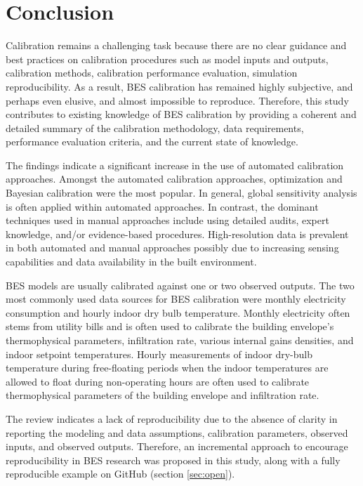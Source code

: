 \documentclass[review]{elsarticle}
\begin{document}
\section{Conclusion} \label{sec:conclusion}

Calibration remains a challenging task because there are no clear guidance and best practices on calibration procedures such as model inputs and outputs, calibration methods, calibration performance evaluation, simulation reproducibility. As a result, BES calibration has remained highly subjective, and perhaps even elusive, and almost impossible to reproduce. Therefore, this study contributes to existing knowledge of BES calibration by providing a coherent and detailed summary of the calibration methodology, data requirements, performance evaluation criteria, and the current state of knowledge. 


The findings indicate a significant increase in the use of automated calibration approaches. Amongst the automated calibration approaches, optimization and Bayesian calibration were the most popular. In general, global sensitivity analysis is often applied within automated approaches. In contrast, the dominant techniques used in manual approaches include using detailed audits, expert knowledge, and/or evidence-based procedures. High-resolution data is prevalent in both automated and manual approaches possibly due to increasing sensing capabilities and data availability in the built environment. 

BES models are usually calibrated against one or two observed outputs. The two most commonly used data sources for BES calibration were monthly electricity consumption and hourly indoor dry bulb temperature. Monthly electricity often stems from utility bills and is often used to calibrate the building envelope's thermophysical parameters, infiltration rate, various internal gains densities, and indoor setpoint temperatures. Hourly measurements of indoor dry-bulb temperature during free-floating periods when the indoor temperatures are allowed to float during non-operating hours are often used to calibrate thermophysical parameters of the building envelope and infiltration rate.

The review indicates a lack of reproducibility due to the absence of clarity in reporting the modeling and data assumptions, calibration parameters, observed inputs, and observed outputs. Therefore, an incremental approach to encourage reproducibility in BES research was proposed in this study, along with a fully reproducible example on GitHub (section \ref{sec:open}). 
\end{document}
